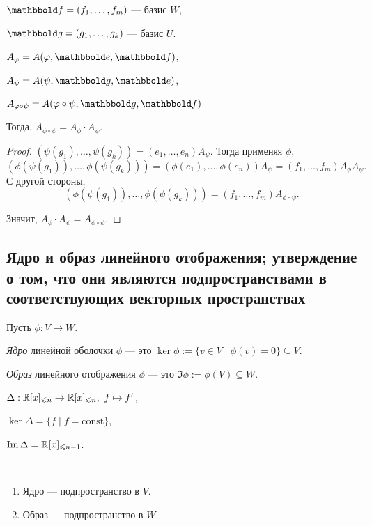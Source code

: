$\F = (f_1, \dots, f_m)$ --- базис $W$,

$\G = (g_1, \dots, g_k)$ --- базис $U$.

$A_{\phi} = A(\phi, \E, \F)$,

$A_\psi = A(\psi, \G, \E)$,

$A_{\phi \circ \psi} = A(\phi \circ \psi, \G, \F)$.

Тогда, $A_{\phi \circ \psi} = A_\phi \cdot A_\psi$.

\begin{proof}
    $(\psi(g_1), \dots, \psi(g_k)) = (e_1, \dots, e_n) A_\psi$.
    Тогда применяя $\phi$,
    \begin{equation*}
        \left(\phi\left(\psi(g_1)\right), \dots, \phi\left(\psi(g_k)\right)\right) = \left(\phi(e_1), \dots, \phi(e_n)\right) A_\psi = (f_1, \dots, f_m) A_\phi A_\psi
    .\end{equation*}
    С другой стороны,
    \begin{equation*}
        \left(\phi\left(\psi(g_1)\right), \dots, \phi\left(\psi(g_k)\right)\right) = (f_1, \dots, f_m) A_{\phi \circ \psi}
    .\end{equation*}

    Значит, $A_\phi \cdot A_\psi = A_{\phi \circ \psi}$.
\end{proof}


\subsection{Ядро и образ линейного отображения; утверждение о том, что они являются подпространствами в соответствующих векторных пространствах}

Пусть $\phi : V \to W$.

\begin{definition}
    \textit{Ядро} линейной оболочки $\phi$ --- это $\ker \phi := \{v \in V \mid \phi(v) = 0\} \subseteq V$.

    \textit{Образ} линейного отображения $\phi$ --- это $\Im \phi := \phi(V) \subseteq W$.
\end{definition}

\begin{example}
    $\Delta : \mathbb{R}[x]_{\leqslant n} \to \mathbb{R}[x]_{\leqslant n}, \ f \mapsto f'$,

    $\ker \Delta = \{f \mid f = \text{const}\}$,

    $\operatorname{\mathop{\mathrm{Im}}} \Delta = \mathbb{R}[x]_{\leqslant n - 1}$.
\end{example}

\begin{proposal}~
    \begin{enumerate}
    \item Ядро --- подпространство в $V$.
    \item Образ --- подпространство в $W$.
    \end{enumerate}
\end{proposal}

